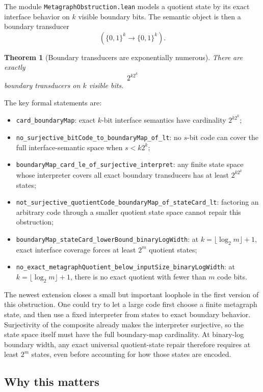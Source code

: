 \documentclass[11pt]{article}
\newtheorem{theorem}{Theorem}[section]
\theoremstyle{remark}
\begin{document}
The module \texttt{MetagraphObstruction.lean} models a quotient state by its exact interface
behavior on \(k\) visible boundary bits.  The semantic object is then a boundary transducer
\[
  (\{0,1\}^k \to \{0,1\}^k).
\]

\begin{theorem}[Boundary transducers are exponentially numerous]
There are exactly
\[
  2^{k 2^k}
\]
boundary transducers on \(k\) visible bits.
\end{theorem}

\noindent
The key formal statements are:
\begin{itemize}[leftmargin=1.5em]
  \item \texttt{card\_boundaryMap}: exact \(k\)-bit interface semantics have cardinality
  \(2^{k2^k}\);
  \item \texttt{no\_surjective\_bitCode\_to\_boundaryMap\_of\_lt}: no \(s\)-bit code can cover the
  full interface-semantic space when \(s < k2^k\);
  \item \texttt{boundaryMap\_card\_le\_of\_surjective\_interpret}: any finite state space whose
  interpreter covers all exact boundary transducers has at least \(2^{k2^k}\) states;
  \item \texttt{not\_surjective\_quotientCode\_boundaryMap\_of\_stateCard\_lt}: factoring an
  arbitrary code through a smaller quotient state space cannot repair this obstruction;
  \item \texttt{boundaryMap\_stateCard\_lowerBound\_binaryLogWidth}: at
  \(k = \lfloor \log_2 m \rfloor + 1\), exact interface coverage forces at least \(2^m\) quotient
  states;
  \item \texttt{no\_exact\_metagraphQuotient\_below\_inputSize\_binaryLogWidth}: at
  \(k = \lfloor \log_2 m \rfloor + 1\), there is no exact quotient with fewer than \(m\) code bits.
\end{itemize}

The newest extension closes a small but important loophole in the first version of this
obstruction.  One could try to let a large code first choose a finite metagraph state, and then use
a fixed interpreter from states to exact boundary behavior.  Surjectivity of the composite already
makes the interpreter surjective, so the state space itself must have the full boundary-map
cardinality.  At binary-log boundary width, any exact universal quotient-state repair therefore
requires at least \(2^m\) states, even before accounting for how those states are encoded.

\subsection{Why this matters}
\end{document}

